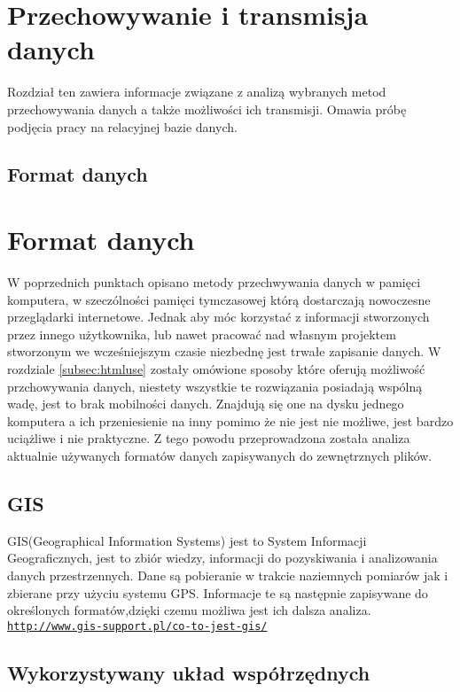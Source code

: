 

\section{Przechowywanie i transmisja danych}
\label{sec:przesyl}

Rozdział ten zawiera informacje związane z analizą wybranych metod przechowywania danych a także możliwości ich transmisji.
Omawia próbę podjęcia pracy na relacyjnej bazie danych.

\subsection{Format danych}
\label{sec:format}
\section{Format danych}
\label{sec:dataformat}

W poprzednich punktach opisano metody przechwywania danych w pamięci komputera, w szeczólności pamięci tymczasowej którą dostarczają nowoczesne przeglądarki internetowe. Jednak aby móc korzystać z informacji stworzonych przez innego użytkownika, lub nawet pracować nad własnym projektem stworzonym we wcześniejszym czasie niezbednę jest trwałe zapisanie danych. W rozdziale \ref{subsec:htmluse} zostały omówione sposoby które oferują możliwość przchowywania danych, niestety wszystkie te rozwiązania posiadają wspólną wadę, jest to brak mobilności danych. Znajdują się one na dysku jednego komputera a ich przeniesienie na inny pomimo że nie jest nie możliwe, jest bardzo uciążliwe i nie praktyczne. Z tego powodu przeprowadzona została analiza aktualnie używanych formatów danych zapisywanych do zewnętrznych plików.

\subsection{GIS}
\label{subsec:gis}

GIS(Geographical Information Systems) jest to System Informacji Geograficznych, jest to zbiór wiedzy, informacji do pozyskiwania i analizowania danych przestrzennych. Dane są pobieranie w trakcie naziemnych pomiarów jak i zbierane przy użyciu systemu GPS. Informacje te są następnie zapisywane do określonych formatów,dzięki czemu możliwa jest ich dalsza analiza. \underline{\texttt{http://www.gis-support.pl/co-to-jest-gis/}}


\subsection{Wykorzystywany układ współrzędnych}
\label{subsec:uklad}

